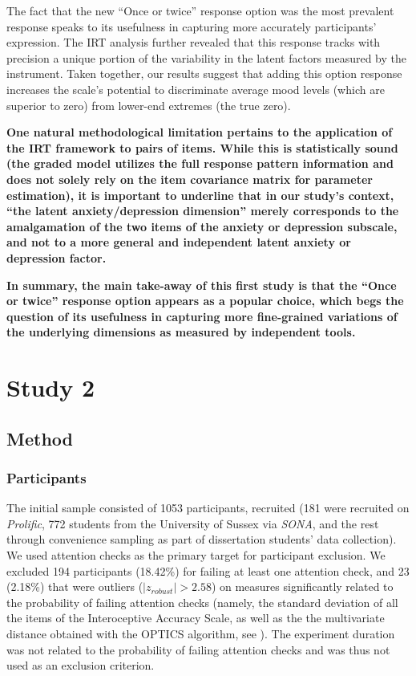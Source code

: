 \documentclass[
  jou,
  longtable,
  nolmodern,
  notxfonts,
  notimes,
  mask,
  colorlinks=true,linkcolor=blue,citecolor=blue,urlcolor=blue]{apa7}
\begin{document}
The fact that the new ``Once or twice'' response option was the most
prevalent response speaks to its usefulness in capturing more accurately
participants' expression. The IRT analysis further revealed that this
response tracks with precision a unique portion of the variability in
the latent factors measured by the instrument. Taken together, our
results suggest that adding this option response increases the scale's
potential to discriminate average mood levels (which are superior to
zero) from lower-end extremes (the true zero).

\textbf{One natural methodological limitation pertains to the
application of the IRT framework to pairs of items. While this is
statistically sound (the graded model utilizes the full response pattern
information and does not solely rely on the item covariance matrix for
parameter estimation), it is important to underline that in our study's
context, ``the latent anxiety/depression dimension'' merely corresponds
to the amalgamation of the two items of the anxiety or depression
subscale, and not to a more general and independent latent anxiety or
depression factor.}

\textbf{In summary, the main take-away of this first study is that the
``Once or twice'' response option appears as a popular choice, which
begs the question of its usefulness in capturing more fine-grained
variations of the underlying dimensions as measured by independent
tools.}

\section{Study 2}\label{study-2}

\subsection{Method}\label{method-1}

\subsubsection{Participants}\label{participants-1}

The initial sample consisted of 1053 participants, recruited (181 were
recruited on \emph{Prolific}, 772 students from the University of Sussex
via \emph{SONA}, and the rest through convenience sampling as part of
dissertation students' data collection). We used attention checks as the
primary target for participant exclusion. We excluded 194 participants
(18.42\%) for failing at least one attention check, and 23 (2.18\%) that
were outliers (\(|z_{robust}| > 2.58\)) on measures significantly
related to the probability of failing attention checks (namely, the
standard deviation of all the items of the Interoceptive Accuracy Scale,
as well as the the multivariate distance obtained with the OPTICS
algorithm, see ). The experiment duration was not related to the probability of
failing attention checks and was thus not used as an exclusion
criterion.
\end{document}
